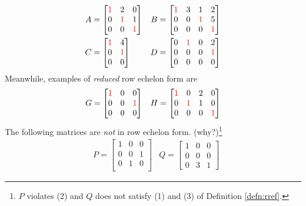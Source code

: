 \begin{align*}
A &=
\begin{bmatrix}
\textcolor{red}{1} & 2 & 0 \\
0 & \textcolor{red}{1} & 1 \\
0 & 0 & \textcolor{red}{1}
\end{bmatrix}
& B &=
\begin{bmatrix}
\textcolor{red}{1} & 3 & 1 & 2 \\
0 & 0 & \textcolor{red}{1} & 5 \\
0 & 0 & 0 & \textcolor{red}{1}
\end{bmatrix} \\
C &=
\begin{bmatrix}
\textcolor{red}{1} & 4 \\
0 & \textcolor{red}{1} \\
0 & 0 
\end{bmatrix}
& D &=
\begin{bmatrix}
0 & \textcolor{red}{1} & 0 & 2 \\
0 & 0 & 0 & \textcolor{red}{1} \\
0 & 0 & 0 & 0
\end{bmatrix}
\end{align*}
Meanwhile, examples of \textit{reduced} row echelon form are
\begin{align*}
& G =
\begin{bmatrix}
\textcolor{red}{1} & 0 & 0 \\
0 & 0 & \textcolor{red}{1}\\
0 & 0 & 0 
\end{bmatrix}
& H =
\begin{bmatrix}
\textcolor{red}{1} & 0 & 2 & 0 \\
0 & \textcolor{red}{1} & 1 & 0 \\
0 & 0 & 0 & \textcolor{red}{1}
\end{bmatrix}
\end{align*}
The following matrices are \textit{not} in row echelon form. (why?)\footnote{$P$ violates (2) and $Q$ does not satisfy (1) and (3) of Definition \ref{defn:rref}.}
\begin{align*}
& P =
\begin{bmatrix}
1 & 0 & 0 \\
0 & 0 & 1 \\
0 & 1 & 0 \\
\end{bmatrix}
& Q =
\begin{bmatrix}
1 & 0 & 0 \\
0 & 0 & 0 \\
0 & 3 & 1
\end{bmatrix}
\end{align*}
